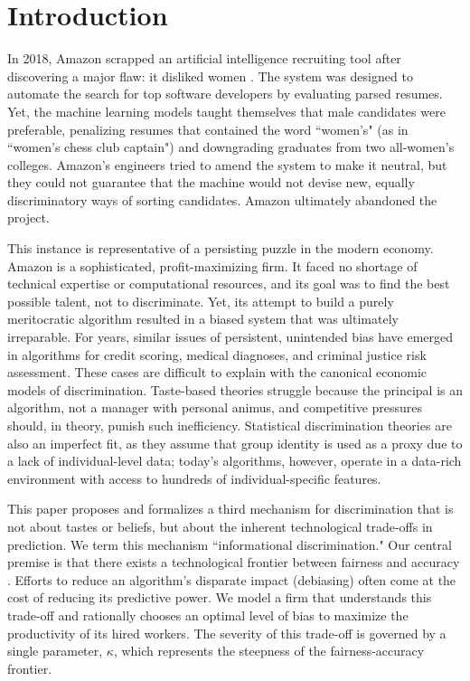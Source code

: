 \section{Introduction}

In 2018, Amazon scrapped an artificial intelligence recruiting tool after discovering a major flaw: it disliked women \citep{Dastin2018}. The system was designed to automate the search for top software developers by evaluating parsed resumes. Yet, the machine learning models taught themselves that male candidates were preferable, penalizing resumes that contained the word ``women's" (as in ``women's chess club captain") and downgrading graduates from two all-women's colleges. Amazon's engineers tried to amend the system to make it neutral, but they could not guarantee that the machine would not devise new, equally discriminatory ways of sorting candidates. Amazon ultimately abandoned the project.

This instance is representative of a persisting puzzle in the modern economy. Amazon is a sophisticated, profit-maximizing firm. It faced no shortage of technical expertise or computational resources, and its goal was to find the best possible talent, not to discriminate. Yet, its attempt to build a purely meritocratic algorithm resulted in a biased system that was ultimately irreparable. For years, similar issues of persistent, unintended bias have emerged in algorithms for credit scoring, medical diagnoses, and criminal justice risk assessment. These cases are difficult to explain with the canonical economic models of discrimination. Taste-based theories \citep{Becker1957} struggle because the principal is an algorithm, not a manager with personal animus, and competitive pressures should, in theory, punish such inefficiency. Statistical discrimination theories \citep{Phelps1972, Arrow1973} are also an imperfect fit, as they assume that group identity is used as a proxy due to a lack of individual-level data; today's algorithms, however, operate in a data-rich environment with access to hundreds of individual-specific features.

This paper proposes and formalizes a third mechanism for discrimination that is not about tastes or beliefs, but about the inherent technological trade-offs in prediction. We term this mechanism ``informational discrimination." Our central premise is that there exists a technological frontier between fairness and accuracy \citep{Kleinberg2017, Chouldechova2017}. Efforts to reduce an algorithm's disparate impact (debiasing) often come at the cost of reducing its predictive power. We model a firm that understands this trade-off and rationally chooses an optimal level of bias to maximize the productivity of its hired workers. The severity of this trade-off is governed by a single parameter, $\kappa$, which represents the steepness of the fairness-accuracy frontier.

